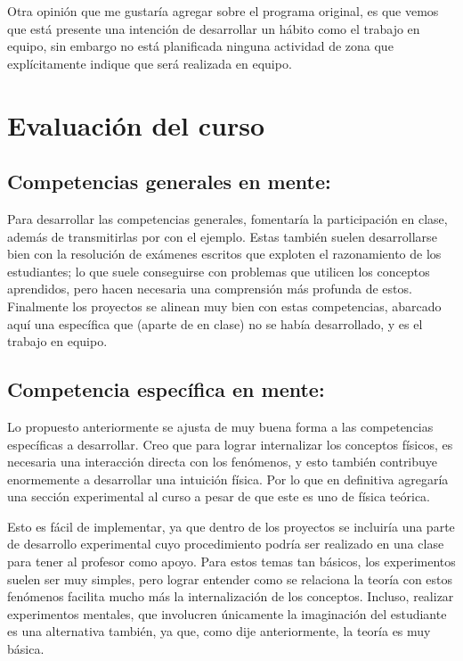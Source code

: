 Otra opinión que me gustaría agregar sobre el programa original, es que vemos que está presente una intención de desarrollar un hábito como el trabajo en equipo, sin embargo no está planificada ninguna actividad de zona que explícitamente indique que será realizada en equipo.

\section{Evaluación del curso}

\subsection{Competencias generales en mente:}\label{sec:gen}
Para desarrollar las competencias generales, fomentaría la participación en clase, además de transmitirlas por con el ejemplo. Estas también suelen desarrollarse bien con la resolución de exámenes escritos que exploten el razonamiento de los estudiantes; lo que suele conseguirse con problemas que utilicen los conceptos aprendidos, pero hacen necesaria una comprensión más profunda de estos. 
Finalmente los proyectos se alinean muy bien con estas competencias, abarcado aquí una específica que (aparte de en clase) no se había desarrollado, y es el trabajo en equipo.

\subsection{Competencia específica en mente:}\label{sec:esp}
Lo propuesto anteriormente se ajusta de muy buena forma a las competencias específicas a desarrollar. Creo que para lograr internalizar los conceptos físicos, es necesaria una interacción directa con los fenómenos, y esto también contribuye enormemente a desarrollar una intuición física. Por lo que en definitiva agregaría una sección experimental al curso a pesar de que este es uno de física teórica. 

Esto es fácil de implementar, ya que dentro de los proyectos se incluiría una parte de desarrollo experimental cuyo procedimiento podría ser realizado en una clase para tener al profesor como apoyo. Para estos temas tan básicos, los experimentos suelen ser muy simples, pero lograr entender como se relaciona la teoría con estos fenómenos facilita mucho más la internalización de los conceptos.
Incluso, realizar experimentos mentales, que involucren únicamente la imaginación del estudiante es una alternativa también, ya que, como dije anteriormente, la teoría es muy básica.

